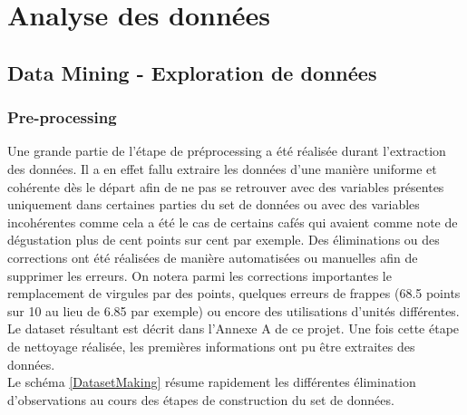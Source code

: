 \chapter{Analyse des données}








\section{Data Mining - Exploration de données}

\subsection{Pre-processing}



Une grande partie de l'étape de préprocessing a été réalisée durant l'extraction des données. Il a en effet fallu extraire les données d'une manière uniforme et cohérente dès le départ afin de ne pas se retrouver avec des variables présentes uniquement dans certaines parties du set de données ou avec des variables incohérentes comme cela a été le cas de certains cafés qui avaient comme note de dégustation plus de cent points sur cent par exemple. Des éliminations ou des corrections ont été réalisées de manière automatisées ou manuelles afin de supprimer les erreurs. On notera parmi les corrections importantes le remplacement de virgules par des points, quelques erreurs de frappes (68.5 points sur 10 au lieu de 6.85 par exemple) ou encore des utilisations d'unités différentes. Le dataset résultant est décrit dans l'Annexe A de ce projet. Une fois cette étape de nettoyage réalisée, les premières informations ont pu être extraites des données.\\


\noindent Le schéma \ref{DatasetMaking} résume rapidement les différentes élimination d'observations au cours des étapes de construction du set de données. 

